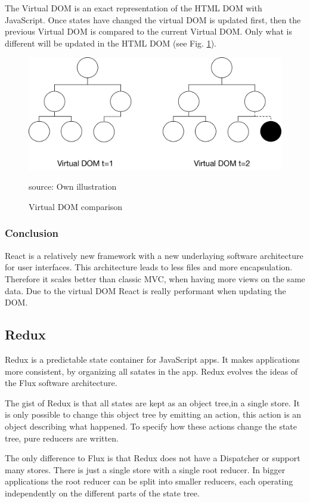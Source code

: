 The Virtual DOM is an exact representation of the HTML DOM with JavaScript. Once states have changed the virtual DOM is updated first, then the previous Virtual DOM is compared to the current Virtual DOM. Only what is different will be updated in the HTML DOM (see Fig. \ref{fig:VirtualDom}).

\begin{figure}[H]
	\centering
	\includegraphics[width=0.8\linewidth]{bilder/grundlagen/VirtualDom.png}
	\caption{Virtual DOM comparison} source: Own illustration
	\label{fig:VirtualDom}
\end{figure}


\subsubsection{Conclusion}
React is a relatively new framework with a new underlaying software architecture for user interfaces. This architecture leads to less files and more encapsulation. Therefore it scales better than classic MVC, when having more views on the same data. Due to the virtual DOM React is really performant when updating the DOM.


\subsection{Redux}
Redux is a predictable state container for JavaScript apps. It makes applications more consistent, by organizing all satates in the app. Redux evolves the ideas of the Flux software architecture.
 
The gist of Redux is that all states are kept as an object tree,in a single store. It is only possible to change this object tree by emitting an action, this action is an object describing what happened. To specify how these actions change the state tree, pure reducers are written.

The only difference to Flux is that Redux does not have a Dispatcher or support many stores. There is just a single store with a single root reducer. In bigger applications the root reducer can be split into smaller reducers, each operating independently on the different parts of the state tree.

